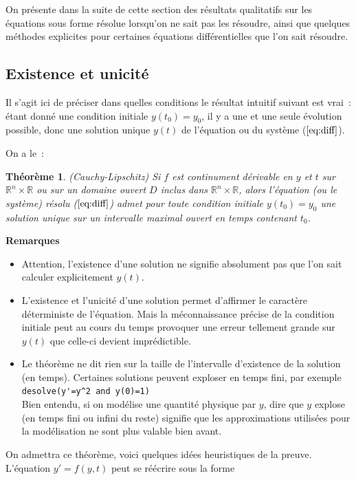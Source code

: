 \documentclass[a4paper,11pt]{article}
\newtheorem{thm}{Théorème}
\begin{document}
\begin{giacjshere}
On pr\'esente dans la suite de cette section 
des r\'esultats qualitatifs sur les \'equations sous forme r\'esolue
lorsqu'on ne sait pas les r\'esoudre, ainsi que 
quelques m\'ethodes explicites
pour certaines \'equations diff\'erentielles que l'on sait
r\'esoudre.

\subsection{Existence et unicit\'e} \label{sec:existence}
Il s'agit ici de pr\'eciser dans quelles conditions le r\'esultat
intuitif suivant est vrai~: \'etant donn\'e une condition initiale
$y(t_0)=y_0$, il y a une et une seule \'evolution possible, donc
une solution unique $y(t)$ de l'\'equation ou du syst\`eme
(\(\ref{eq:diff}\)).

On a le~:
\begin{thm} \label{thm:eqdiff} (Cauchy-Lipschitz)
Si $f$ est continument d\'erivable en $y$ et $t$ sur $\mathbb{R}^n \times \mathbb{R}$
ou sur un domaine ouvert $D$ inclus dans $\mathbb{R}^n \times \mathbb{R}$, alors l'\'equation
(ou le syst\`eme) r\'esolu (\(\ref{eq:diff}\)) admet pour toute condition
initiale $y(t_0)=y_0$ une solution unique
sur un intervalle maximal ouvert en temps contenant $t_0$.
\end{thm}
{\bf Remarques}
\begin{itemize}
\item
Attention, l'existence d'une solution ne signifie absolument pas que
l'on sait calculer explicitement $y(t)$.
\item
L'existence et l'unicit\'e d'une solution permet d'affirmer le
caract\`ere d\'eterministe de l'\'equation. Mais la m\'econnaissance
pr\'ecise de la condition initiale peut au cours du temps
provoquer une erreur tellement grande sur $y(t)$
que celle-ci devient impr\'edictible.
\item Le th\'eor\`eme ne dit rien sur la taille de l'intervalle
d'existence de la solution (en temps). Certaines solutions
peuvent exploser en temps fini, par exemple\\
\verb|desolve(y'=y^2 and y(0)=1)|\\
Bien entendu, si on mod\'elise une quantit\'e physique par $y$, dire
que $y$ explose (en temps fini ou infini du reste)
signifie que les approximations utilis\'ees pour la mod\'elisation
ne sont plus valable bien avant.
\end{itemize}
On admettra ce th\'eor\`eme, voici quelques id\'ees heuristiques
de la preuve. L'\'equation $y'=f(y,t)$ peut se r\'e\'ecrire sous la forme

\end{giacjshere}
\end{document}
